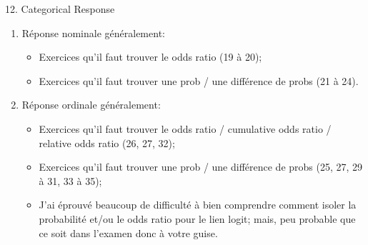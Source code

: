 \documentclass[12pt, titlepage, french]{report}
\begin{document}
\begin{CHPT_SUMM}{12. Categorical Response}
\begin{enumerate}
	\item	Réponse nominale généralement:
	\begin{itemize}
		\item	Exercices qu'il faut trouver le odds ratio (19 à 20);
		\item	Exercices qu'il faut trouver une prob / une différence de probs (21 à 24).
	\end{itemize}
	\item	Réponse ordinale généralement:
	\begin{itemize}
		\item	Exercices qu'il faut trouver le odds ratio / cumulative odds ratio / relative odds ratio (26, 27, 32);
		\item	Exercices qu'il faut trouver une prob / une différence de probs (25, 27, 29 à 31, 33 à 35);
		\item	J'ai éprouvé beaucoup de difficulté à bien comprendre comment isoler la probabilité et/ou le odds ratio pour le lien logit; mais, peu probable que ce soit dans l'examen donc à votre guise.
	\end{itemize}
\end{enumerate}
\end{CHPT_SUMM}
\end{document}
